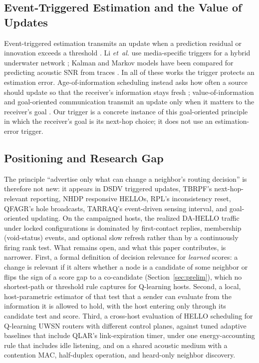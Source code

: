 \subsection{Event-Triggered Estimation and the Value of Updates}
Event-triggered estimation transmits an update when a prediction residual
or innovation exceeds a threshold
\cite{priel2023consensus,sebastian2024eco,deng2023auto,deng2024lcsys,zhong2024tsp}.
Li \emph{et~al.} use media-specific triggers for a hybrid underwater
network \cite{li2026dse}; Kalman and Markov models have been compared for
predicting acoustic SNR from traces \cite{busacca2024snr}.
In all of these works the trigger protects an estimation error.
Age-of-information scheduling instead asks how often a source should
update so that the receiver's information stays fresh
\cite{kaul2012aoi,yates2021aoisurvey}; value-of-information and
goal-oriented communication transmit an update only when it matters to
the receiver's goal
\cite{ayan2019voi,kountouris2021semantics,li2024got}.
Our trigger is a concrete instance of this goal-oriented principle in
which the receiver's goal is its next-hop choice; it does not use an
estimation-error trigger.

\subsection{Positioning and Research Gap}
The principle ``advertise only what can change a neighbor's routing
decision'' is therefore not new: it appears in DSDV triggered updates,
TBRPF's next-hop-relevant reporting, NHDP responsive HELLOs, RPL's
inconsistency reset, QFAGR's hole broadcasts, TARRAQ's event-driven
sensing interval, and goal-oriented updating.
On the campaigned hosts, the realized DA-HELLO traffic under locked
configurations is dominated by first-contact replies, membership
(void-status) events, and optional slow refresh rather than by a
continuously firing rank test.
What remains open, and what this paper contributes, is narrower.
First, a formal definition of decision relevance for \emph{learned}
scores: a change is relevant if it alters whether a node is a candidate
of some neighbor or flips the sign of a score gap to a co-candidate
(Section~\ref{sec:prelim}), which no shortest-path or threshold rule
captures for Q-learning hosts.
Second, a local, host-parametric estimator of that test that a sender
can evaluate from the information it is allowed to hold, with the host
entering only through its candidate test and score.
Third, a cross-host evaluation of HELLO scheduling for Q-learning UWSN
routers with different control planes, against tuned adaptive
baselines that include QLAR's link-expiration timer, under one
energy-accounting rule that includes idle listening, and on a shared
acoustic medium with a contention MAC, half-duplex operation, and
heard-only neighbor discovery.
